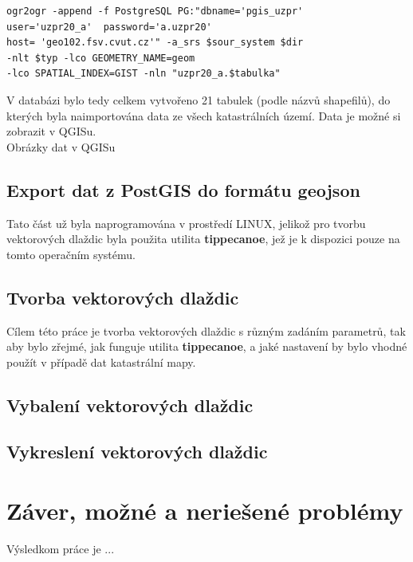 \documentclass[12pt]{article}
\begin{document}
\begin{lstlisting}
ogr2ogr -append -f PostgreSQL PG:"dbname='pgis_uzpr' 
user='uzpr20_a'  password='a.uzpr20' 
host= 'geo102.fsv.cvut.cz'" -a_srs $sour_system $dir 
-nlt $typ -lco GEOMETRY_NAME=geom 
-lco SPATIAL_INDEX=GIST -nln "uzpr20_a.$tabulka"
\end{lstlisting}

V databázi bylo tedy celkem vytvořeno 21 tabulek (podle názvů shapefilů), do kterých byla naimportována data ze všech katastrálních území. Data je možné si zobrazit v QGISu.\\

Obrázky dat v QGISu

\subsection{Export dat z PostGIS do formátu geojson}

Tato část už byla naprogramována v prostředí LINUX, jelikož pro tvorbu vektorových dlaždic byla použita utilita \textbf{tippecanoe}, jež je k dispozici pouze na tomto operačním systému.


\subsection{Tvorba vektorových dlaždic}
Cílem této práce je tvorba vektorových dlaždic s různým zadáním parametrů, tak aby bylo zřejmé, jak funguje utilita \textbf{tippecanoe}, a jaké nastavení by bylo vhodné použít v případě dat katastrální mapy.

\subsection{Vybalení vektorových dlaždic}

\subsection{Vykreslení vektorových dlaždic}






\clearpage
\section{Záver, možné a neriešené problémy}
Výsledkom práce je ...

\newpage

\listoffigures


\listoftables

\nocite{*}
{}

    
\end{document}
